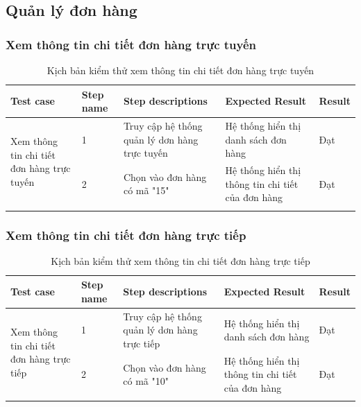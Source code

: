 \subsection{Quản lý đơn hàng}
\subsubsection{ Xem thông tin chi tiết đơn hàng trực tuyến}
{
    \setlength\extrarowheight{6pt}
    \begin{longtable}{| p{2.5cm}| p{1cm}| p{5.5cm}| p{4.5cm} | p{1.5cm} |}
        \hline
        \textbf{Test case}                                                  & \textbf{Step name} & \textbf{Step descriptions}                    & \textbf{Expected Result}                          & \textbf{Result} \\
        \hline
        \multirow[t]{2}{2.5cm}{ Xem thông tin chi tiết đơn hàng trực tuyến} & 1                  & Truy cập hệ thống quản lý dơn hàng trực tuyến & Hệ thống hiển thị danh sách đơn hàng              & Đạt             \\
        \cline{2-5}
                                                                            & 2                  & Chọn vào đơn hàng có mã "15"                  & Hệ thống hiển thị thông tin chi tiết của đơn hàng & Đạt             \\
        \hline
        \caption{Kịch bản kiểm thử xem thông tin chi tiết đơn hàng trực tuyến}
    \end{longtable}
}

\subsubsection{ Xem thông tin chi tiết đơn hàng trực tiếp}
{
    \setlength\extrarowheight{6pt}
    \begin{longtable}{| p{2.5cm}| p{1cm}| p{5.5cm}| p{4.5cm} | p{1.5cm} |}
        \hline
        \textbf{Test case}                                                 & \textbf{Step name} & \textbf{Step descriptions}                   & \textbf{Expected Result}                          & \textbf{Result} \\
        \hline
        \multirow[t]{2}{2.5cm}{ Xem thông tin chi tiết đơn hàng trực tiếp} & 1                  & Truy cập hệ thống quản lý dơn hàng trực tiếp & Hệ thống hiển thị danh sách đơn hàng              & Đạt             \\
        \cline{2-5}
                                                                           & 2                  & Chọn vào đơn hàng có mã "10"                 & Hệ thống hiển thị thông tin chi tiết của đơn hàng & Đạt             \\
        \hline
        \caption{Kịch bản kiểm thử xem thông tin chi tiết đơn hàng trực tiếp}
    \end{longtable}
}

